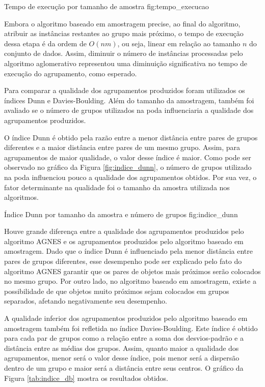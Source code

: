 {Tempo de execução por tamanho de amostra}
{fig:tempo_execucao}

Embora o algoritmo baseado em amostragem precise, ao final do algoritmo,
atribuir as instâncias restantes ao grupo mais próximo, o tempo de execução 
dessa etapa é da ordem de $O\left(nm\right)$, ou seja, linear em relação ao 
tamanho $n$ do conjunto de dados. Assim, diminuir o número de instâncias
processadas pelo algoritmo aglomerativo representou uma diminuição significativa
no tempo de execução do agrupamento, como esperado. 

Para comparar a qualidade dos agrupamentos produzidos foram utilizados os
índices Dunn e Davies-Boulding. Além do tamanho da amostragem, também foi
avaliado se o número de grupos utilizados na poda influenciaria a qualidade dos
agrupamentos produzidos.

O índice Dunn é obtido pela razão entre a menor distância entre pares de grupos
diferentes e a maior distância entre pares de um mesmo grupo. Assim, para
agrupamentos de maior qualidade, o valor desse índice é maior. Como pode ser 
observado no gráfico da Figura \ref{fig:indice_dunn}, o número de grupos
utilizado na poda influenciou pouco a qualidade dos agrupamentos obtidos. Por
sua vez, o fator determinante na qualidade foi o tamanho da amostra utilizada
nos algoritmos.

{Índice Dunn por tamanho da amostra e número de grupos}
{fig:indice_dunn}

Houve grande diferença entre a qualidade dos agrupamentos produzidos pelo
algoritmo AGNES e os agrupamentos produzidos pelo algoritmo baseado em
amostragem. Dado que o índice Dunn é influenciado pela menor distância entre
pares de grupos diferentes, esse desempenho pode ser explicado pelo fato do 
algoritmo AGNES garantir que os pares de objetos mais próximos serão colocados 
no mesmo grupo. Por outro lado, no algoritmo baseado em amostragem, existe a
possibilidade de que objetos muito próximos sejam colocados em grupos separados,
afetando negativamente seu desempenho.

A qualidade inferior dos agrupamentos produzidos pelo algoritmo baseado em 
amostragem também foi refletida no índice Davies-Boulding. Este índice é obtido
para cada par de grupos como a relação entre a soma dos desvios-padrão e a 
distância entre as médias dos grupos. Assim, quanto maior a qualidade dos 
agrupamentos, menor será o valor desse índice, pois menor será a dispersão
dentro de um grupo e maior será a distância entre seus centros. O gráfico da
Figura \ref{tab:indice_db} mostra os resultados obtidos.

